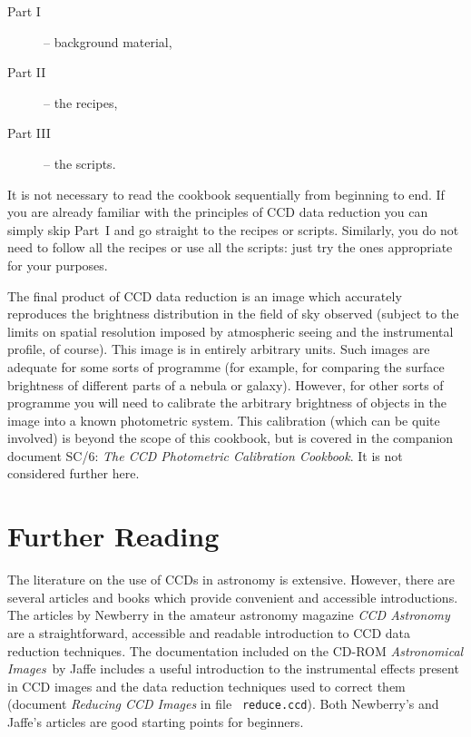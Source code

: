 \documentclass[twoside,11pt]{article}
\newcommand{\xref}[3]{#1}
\newcommand{\xlabel}[1]{}
\begin{document}
\begin{description}

  \item[{\rm Part I}] -- background material,

  \item[{\rm Part II}] -- the recipes,

  \item[{\rm Part III}] -- the scripts.

\end{description}

It is not necessary to read the cookbook sequentially from beginning
to end.  If you are already familiar with the principles of CCD data
reduction you can simply skip Part~I and go straight to the recipes or
scripts.  Similarly, you do not need to follow all the recipes or use all
the scripts: just try the ones appropriate for your purposes.

The final product of CCD data reduction is an image which accurately
reproduces the brightness distribution in the field of sky observed
(subject to the limits on spatial resolution imposed by atmospheric
seeing and the instrumental profile, of course).  This image is in entirely
arbitrary units.  Such images are adequate for some sorts of programme
(for example, for comparing the surface brightness of different parts of
a nebula or galaxy).  However, for other sorts of programme you will need
to calibrate the arbitrary brightness of objects in the image into a known
photometric system.  This calibration (which can be quite involved) is
beyond the scope of this cookbook, but is covered in the companion document
\xref{SC/6: {\it The CCD Photometric Calibration Cookbook}}{sc6}{}\/\cite{SC6}.
It is not considered further here.


\section{\xlabel{FURTHER}\label{FURTHER}Further Reading}

The literature on the use of CCDs in astronomy is extensive.  However,
there are several articles and books which provide convenient and accessible
introductions.  The articles by Newberry\cite{NEWBERRY95A, NEWBERRY95B,
NEWBERRY96} in the amateur astronomy magazine {\it CCD Astronomy}\, are a
straightforward, accessible and readable introduction to CCD data reduction
techniques.  The documentation included on the CD-ROM {\it Astronomical
Images}\, by Jaffe\cite{JAFFE98} includes a useful introduction to the
instrumental effects present in CCD images and the data reduction techniques
used to correct them (document {\it Reducing CCD Images}\/ in file {\tt
reduce.ccd}).  Both Newberry's and Jaffe's articles are good starting
points for beginners.
\end{document}
